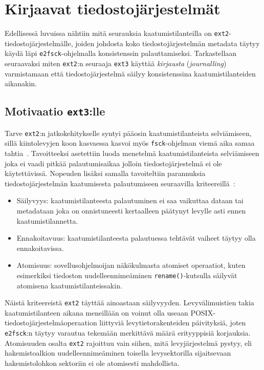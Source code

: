 \section{Kirjaavat tiedostojärjestelmät}
\label{ChapJournallingFs}
Edellisessä luvuissa nähtiin mitä seurauksia kaatumistilanteilla on \texttt{ext2}-tiedostojärjestelmälle,
joiden johdosta koko tiedostojärjestelmän metadata täytyy käydä läpi \texttt{e2fsck}-ohjelmalla konsistenssin palauttamiseksi.
Tarkastellaan seuraavaksi miten \texttt{ext2}:n seuraaja \texttt{ext3} käyttää \emph{kirjausta} (\emph{journalling}) varmistamaan että tiedostojärjestelmä säilyy konsistenssina kaatumistilanteiden aikanakin.

\subsection{Motivaatio \texttt{ext3}:lle}
Tarve \texttt{ext2}:n jatkokehitykselle syntyi pääosin kaatumistilanteista selviämiseen,
sillä kiintolevyjen koon kasvaessa kasvoi myös \texttt{fsck}-ohjelman viemä aika samaa tahtia~\cite{Ext2Journal}.
Tavoitteeksi asetettiin luoda menetelmä kaatumistilanteista selviämiseen joka ei vaadi pitkää palautumisaikaa jolloin tiedostojärjestelmä ei ole käytettävissä.
Nopeuden lisäksi samalla tavoiteltiin parannuksia tiedostojärjestelmän kaatumisesta palautumiseen seuraavilla kriteereillä~\cite{Ext2Journal}:
\begin{itemize}
    \item{Säilyvyys: kaatumistilanteesta palautuminen ei saa vaikuttaa dataan tai metadataan joka on onnistuneesti kertaalleen päätynyt levylle asti ennen kaatumistilannetta.}
    \item{Ennakoitavuus: kaatumistilanteesta palautuessa tehtävät vaiheet täytyy olla ennakoitavissa.}
    \item{Atomisuus: sovellusohjelmoijan näkökulmasta atomiset operaatiot, kuten esimerkiksi tiedoston uudelleennimeäminen \texttt{rename()}-kutsulla säilyvät atomisena kaatumistilanteissakin.}
\end{itemize}
Näistä kriteereistä \texttt{ext2} täyttää ainoastaan säilyvyyden.
Levyvälimuistien takia kaatumistilanteen aikana meneillään on voinut olla useaan POSIX-tiedostojärjestelmäoperaation liittyviä levytietorakenteiden päivityksiä,
joten \texttt{e2fsck}:n täytyy varautua tekemään merkittävä määrä erityyppisiä korjauksia.
Atomisuuden osalta \texttt{ext2} rajoittuu vain siihen,
mitä levyjärjestelmä pystyy,
eli hakemistoalkion uudelleennimeäminen toisella levysektorilla sijaitsevaan hakemistolohkon sektoriin ei ole atomisesti mahdollista.
%

